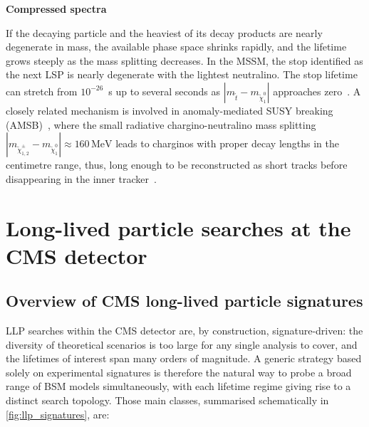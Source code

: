 \vspace{0.5 cm}
\noindent \textbf{Compressed spectra}
\vspace{0.5 cm}

If the decaying particle and the heaviest of its decay products are nearly degenerate in mass, the available phase space shrinks rapidly, and the lifetime grows steeply as the mass splitting decreases. In the MSSM, the stop identified as the next LSP is nearly degenerate with the lightest neutralino. The stop lifetime can stretch from $10^{-26}$~s up to several seconds as $|m_{\tilde{t}} - m_{\tilde{\chi}_{1}^{0}}|$ approaches zero~\cite{Aebischer:2014mma}. A closely related mechanism is involved in anomaly-mediated SUSY breaking (AMSB)~\cite{Ibe:2012sx}, where the small radiative chargino-neutralino mass splitting
$|m_{\tilde{\chi}_{1,2}^{\pm}} - m_{\tilde{\chi}_{1}^{0}}|\approx 160\,\mathrm{MeV}$ leads to charginos with proper decay lengths in the centimetre range, thus, long enough to be reconstructed as short tracks before disappearing in the inner tracker~\cite{ATLAS:2022rme}.



\section{Long-lived particle searches at the CMS detector}

\subsection{Overview of CMS long-lived particle signatures}

LLP searches within the CMS detector are, by construction, signature-driven: the diversity of theoretical scenarios is too large for any single analysis to cover, and the lifetimes of interest span many orders of magnitude. A generic strategy based solely on experimental signatures is therefore the natural way to probe a broad range of BSM models simultaneously, with each lifetime regime giving rise to a distinct search topology. Those main classes, summarised schematically in \cref{fig:llp_signatures}, are:

